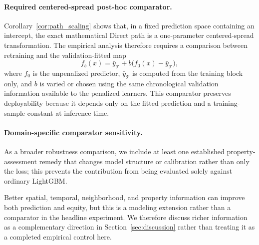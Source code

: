 \documentclass[10pt]{article}
\theoremstyle{definition}
\newcommand{\1}{\mathbf{1}}
\begin{document}
\paragraph{Required centered-spread post-hoc comparator.}
Corollary~\ref{cor:path_scaling} shows that, in a fixed prediction space containing an intercept, the exact mathematical Direct path is a one-parameter centered-spread transformation. The empirical analysis therefore requires a comparison between retraining and the validation-fitted map
\[
f_b(x)=\bar y_{\mathcal T}+b\bigl(f_0(x)-\bar y_{\mathcal T}\bigr),
\]
where $f_0$ is the unpenalized predictor, $\bar y_{\mathcal T}$ is computed from the training block only, and $b$ is varied or chosen using the same chronological validation information available to the penalized learners. This comparator preserves deployability because it depends only on the fitted prediction and a training-sample constant at inference time.

\paragraph{Domain-specific comparator sensitivity.}
As a broader robustness comparison, we include at least one established property-assessment remedy that changes model structure or calibration rather than only the loss; this prevents the contribution from being evaluated solely against ordinary LightGBM.


Better spatial, temporal, neighborhood, and property information can improve both prediction and equity, but this is a modeling extension rather than a comparator in the headline experiment. We therefore discuss richer information as a complementary direction in Section~\ref{sec:discussion} rather than treating it as a completed empirical control here.
\end{document}
